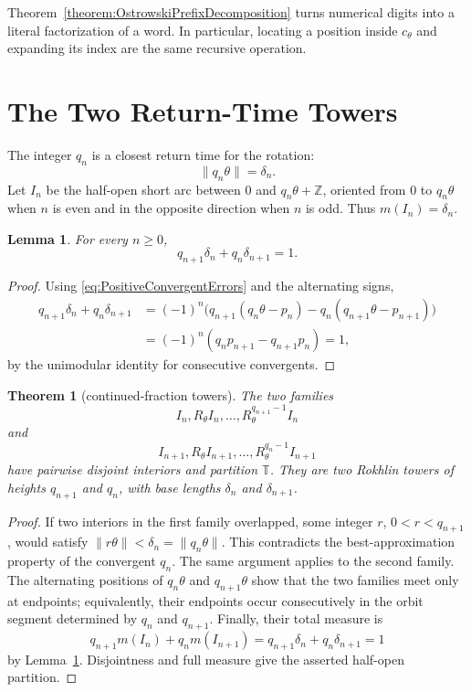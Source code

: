 \documentclass{book}
\newtheorem{lemma}[definition]{Lemma}
\newtheorem{theorem}[definition]{Theorem}
\begin{document}
Theorem~\ref{theorem:OstrowskiPrefixDecomposition} turns numerical digits
into a literal factorization of a word.  In particular, locating a position
inside \(c_\theta\) and expanding its index are the same recursive
operation.

\section{The Two Return-Time Towers}

The integer \(q_n\) is a closest return time for the rotation:
\[
  \|q_n\theta\|=\delta_n.
\]
Let \(I_n\) be the half-open short arc between \(0\) and
\(q_n\theta+\mathbb Z\), oriented from \(0\) to \(q_n\theta\) when \(n\)
is even and in the opposite direction when \(n\) is odd.  Thus
\(m(I_n)=\delta_n\).

\begin{lemma}\label{lemma:TowerMeasureIdentity}
  For every \(n\geq0\),
  \begin{equation}\label{eq:TowerMeasureIdentity}
    q_{n+1}\delta_n+q_n\delta_{n+1}=1.
  \end{equation}
\end{lemma}
\begin{proof}
  Using \eqref{eq:PositiveConvergentErrors} and the alternating signs,
  \begin{align*}
    q_{n+1}\delta_n+q_n\delta_{n+1}
    &=(-1)^n\bigl(q_{n+1}(q_n\theta-p_n)
       -q_n(q_{n+1}\theta-p_{n+1})\bigr)\\
    &=(-1)^n(q_np_{n+1}-q_{n+1}p_n)=1,
  \end{align*}
  by the unimodular identity for consecutive convergents.
\end{proof}

\begin{theorem}[continued-fraction towers]
  \label{theorem:ContinuedFractionTowers}
  The two families
  \[
    I_n,R_\theta I_n,\ldots,R_\theta^{q_{n+1}-1}I_n
  \]
  and
  \[
    I_{n+1},R_\theta I_{n+1},\ldots,
    R_\theta^{q_n-1}I_{n+1}
  \]
  have pairwise disjoint interiors and partition \(\mathbb T\).  They are
  two Rokhlin towers of heights \(q_{n+1}\) and \(q_n\), with base lengths
  \(\delta_n\) and \(\delta_{n+1}\).
\end{theorem}
\begin{proof}
  If two interiors in the first family overlapped, some integer
  \(r\), \(0<r<q_{n+1}\), would satisfy
  \(\|r\theta\|<\delta_n=\|q_n\theta\|\).  This contradicts the
  best-approximation property of the convergent \(q_n\).  The same argument
  applies to the second family.  The alternating positions of
  \(q_n\theta\) and \(q_{n+1}\theta\) show that the two families meet only
  at endpoints; equivalently, their endpoints occur consecutively in the
  orbit segment determined by \(q_n\) and \(q_{n+1}\).  Finally, their
  total measure is
  \[
    q_{n+1}m(I_n)+q_nm(I_{n+1})
    =q_{n+1}\delta_n+q_n\delta_{n+1}=1
  \]
  by Lemma~\ref{lemma:TowerMeasureIdentity}.  Disjointness and full measure
  give the asserted half-open partition.
\end{proof}
\end{document}

